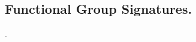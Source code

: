 \documentclass[11pt]{llncs}
\begin{document}
%
%
%
%
%




\subsection{Functional Group Signatures.} \cite{PKC:BoyGolIva14}.
\end{document}
